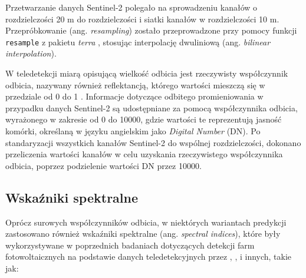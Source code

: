 \documentclass{amuthesis}
\begin{document}
Przetwarzanie danych Sentinel-2 polegało na sprowadzeniu kanałów o
rozdzielczości 20 m do rozdzielczości i siatki kanałów w rozdzielczości
10 m. Przepróbkowanie (ang. \emph{resampling}) zostało przeprowadzone
przy pomocy funkcji \texttt{resample} z pakietu \emph{terra}
\autocite{R-terra}, stosując interpolację dwuliniową (ang.
\emph{bilinear interpolation}).

W teledetekcji miarą opisującą wielkość odbicia jest rzeczywisty
współczynnik odbicia, nazywany również reflektancją, którego wartości
mieszczą się w przedziale od 0 do 1 \autocite{hejmanowska_2020_dane}.
Informacje dotyczące odbitego promieniowania w przypadku danych
Sentinel-2 są udostępniane za pomocą współczynnika odbicia, wyrażonego w
zakresie od 0 do 10000, gdzie wartości te reprezentują jasność komórki,
określaną w języku angielskim jako \emph{Digital Number} (DN). Po
standaryzacji wszystkich kanałów Sentinel-2 do wspólnej rozdzielczości,
dokonano przeliczenia wartości kanałów w celu uzyskania rzeczywistego
współczynnika odbicia, poprzez podzielenie wartości DN przez 10000.

\hypertarget{sec-spectral-indices}{%
\subsection{Wskaźniki spektralne}\label{sec-spectral-indices}}

Oprócz surowych współczynników odbicia, w niektórych wariantach
predykcji zastosowano również wskaźniki spektralne (ang. \emph{spectral
indices}), które były wykorzystywane w poprzednich badaniach dotyczących
detekcji farm fotowoltaicznych na podstawie danych teledetekcyjnych
przez \textcite{zhang_2021_texture}, \textcite{plakman_2022_pv},
\textcite{wang_2022_pv} i innych, takie jak:
\end{document}
